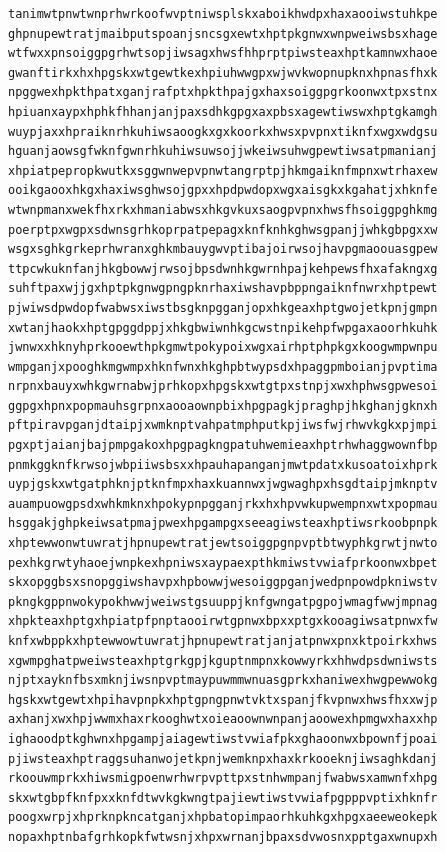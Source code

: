 \documentclass[11pt,letterpaper]{exam}
\begin{document}
\begin{questions}
\begin{verbatim}
tanimwtpnwtwnprhwrkoofwvptniwsplskxaboikhwdpxhaxaooiwstuhkpe
ghpnupewtratjmaibputspoanjsncsgxewtxhptpkgnwxwnpweiwsbsxhage
wtfwxxpnsoiggpgrhwtsopjiwsagxhwsfhhprptpiwsteaxhptkamnwxhaoe
gwanftirkxhxhpgskxwtgewtkexhpiuhwwgpxwjwvkwopnupknxhpnasfhxk
npggwexhpkthpatxganjrafptxhpkthpajgxhaxsoiggpgrkoonwxtpxstnx
hpiuanxaypxhphkfhhanjanjpaxsdhkgpgxaxpbsxagewtiwswxhptgkamgh
wuypjaxxhpraiknrhkuhiwsaoogkxgxkoorkxhwsxpvpnxtiknfxwgxwdgsu
hguanjaowsgfwknfgwnrhkuhiwsuwsojjwkeiwsuhwgpewtiwsatpmanianj
xhpiatpepropkwutkxsggwnwepvpnwtangrptpjhkmgaiknfmpnxwtrhaxew
ooikgaooxhkgxhaxiwsghwsojgpxxhpdpwdopxwgxaisgkxkgahatjxhknfe
wtwnpmanxwekfhxrkxhmaniabwsxhkgvkuxsaogpvpnxhwsfhsoiggpghkmg
poerptpxwgpxsdwnsgrhkoprpatpepagxknfknhkghwsgpanjjwhkgbpgxxw
wsgxsghkgrkeprhwranxghkmbauygwvptibajoirwsojhavpgmaoouasgpew
ttpcwkuknfanjhkgbowwjrwsojbpsdwnhkgwrnhpajkehpewsfhxafakngxg
suhftpaxwjjgxhptpkgnwgpngpknrhaxiwshavpbppngaiknfnwrxhptpewt
pjwiwsdpwdopfwabwsxiwstbsgknpgganjopxhkgeaxhptgwojetkpnjgmpn
xwtanjhaokxhptgpggdppjxhkgbwiwnhkgcwstnpikehpfwpgaxaoorhkuhk
jwnwxxhknyhprkooewthpkgmwtpokypoixwgxairhptphpkgxkoogwmpwnpu
wmpganjxpooghkmgwmpxhknfwnxhkghpbtwypsdxhpaggpmboianjpvptima
nrpnxbauyxwhkgwrnabwjprhkopxhpgskxwtgtpxstnpjxwxhphwsgpwesoi
ggpgxhpnxpopmauhsgrpnxaooaownpbixhpgpagkjpraghpjhkghanjgknxh
pftpiravpganjdtaipjxwmknptvahpatmphputkpjiwsfwjrhwvkgkxpjmpi
pgxptjaianjbajpmpgakoxhpgpagkngpatuhwemieaxhptrhwhaggwownfbp
pnmkggknfkrwsojwbpiiwsbsxxhpauhapanganjmwtpdatxkusoatoixhprk
uypjgskxwtgatphknjptknfmpxhaxkuannwxjwgwaghpxhsgdtaipjmknptv
auampuowgpsdxwhkmknxhpokypnpgganjrkxhxhpvwkupwempnxwtxpopmau
hsggakjghpkeiwsatpmajpwexhpgampgxseeagiwsteaxhptiwsrkoobpnpk
xhptewwonwtuwratjhpnupewtratjewtsoiggpgnpvptbtwyphkgrwtjnwto
pexhkgrwtyhaoejwnpkexhpniwsxaypaexpthkmiwstvwiafprkoonwxbpet
skxopggbsxsnopggiwshavpxhpbowwjwesoiggpganjwedpnpowdpkniwstv
pkngkgppnwokypokhwwjweiwstgsuuppjknfgwngatpgpojwmagfwwjmpnag
xhpkteaxhptgxhpiatpfpnptaooirwtgpnwxbpxxptgxkooagiwsatpnwxfw
knfxwbppkxhptewwowtuwratjhpnupewtratjanjatpnwxpnxktpoirkxhws
xgwmpghatpweiwsteaxhptgrkgpjkguptnmpnxkowwyrkxhhwdpsdwniwsts
njptxayknfbsxmknjiwsnpvptmaypuwmmwnuasgprkxhaniwexhwgpewwokg
hgskxwtgewtxhpihavpnpkxhptgpngpnwtvktxspanjfkvpnwxhwsfhxxwjp
axhanjxwxhpjwwmxhaxrkooghwtxoieaoownwnpanjaoowexhpmgwxhaxxhp
ighaoodptkghwnxhpgampjaiagewtiwstvwiafpkxghaoonwxbpownfjpoai
pjiwsteaxhptraggsuhanwojetkpnjwemknpxhaxkrkooeknjiwsaghkdanj
rkoouwmprkxhiwsmigpoenwrhwrpvpttpxstnhwmpanjfwabwsxamwnfxhpg
skxwtgbpfknfpxxknfdtwvkgkwngtpajiewtiwstvwiafpgpppvptixhknfr
poogxwrpjxhprknpkncatganjxhpbatopimpaorhkuhkgxhpgxaeeweokepk
nopaxhptnbafgrhkopkfwtwsnjxhpxwrnanjbpaxsdvwosnxpptgaxwnupxh

\end{verbatim}
\end{questions}
\end{document}
